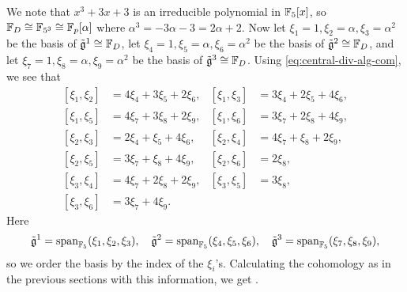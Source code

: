 We note that $x^{3} + 3x + 3$ is an irreducible polynomial in $\mathbb{F}_{5}[x]$, so $\mathbb{F}_{D} \cong \mathbb{F}_{5^{3}} \cong \mathbb{F}_{p}[\alpha]$ where $\alpha^{3} = -3\alpha-3 = 2\alpha + 2$. Now let $\xi_{1} = 1, \xi_{2} = \alpha, \xi_{3} = \alpha^{2}$ be the basis of $\tilde{\mathfrak{g}}^{1} \cong \mathbb{F}_{D}$, let $\xi_{4} = 1, \xi_{5} = \alpha, \xi_{6} = \alpha^{2}$ be the basis of $\tilde{\mathfrak{g}}^{2} \cong \mathbb{F}_{D}$, and let $\xi_{7} = 1, \xi_{8} = \alpha, \xi_{9} = \alpha^{2}$ be the basis of $\tilde{\mathfrak{g}}^{3} \cong \mathbb{F}_{D}$. Using \eqref{eq:central-div-alg-com}, we see that
\begin{equation}\label{eq:central-div-alg-first-com}
  \begin{aligned}
    [\xi_{1},\xi_{2}] &= 4\xi_{4} + 3\xi_{5} + 2\xi_{6}, & [\xi_{1},\xi_{3}] &= 3\xi_{4} + 2\xi_{5} + 4\xi_{6}, \\
    [\xi_{1},\xi_{5}] &= 4\xi_{7} + 3\xi_{8} + 2\xi_{9}, & [\xi_{1},\xi_{6}] &= 3\xi_{7} + 2\xi_{8} + 4\xi_{9}, \\
    [\xi_{2},\xi_{3}] &= 2\xi_{4} + \xi_{5} + 4\xi_{6}, & [\xi_{2},\xi_{4}] &= 4\xi_{7} + \xi_{8} + 2\xi_{9}, \\
    [\xi_{2},\xi_{5}] &= 3\xi_{7} + \xi_{8} + 4\xi_{9}, & [\xi_{2},\xi_{6}] &= 2\xi_{8}, \\
    [\xi_{3},\xi_{4}] &= 4\xi_{7} + 2\xi_{8} + 2\xi_{9}, & [\xi_{3},\xi_{5}] &= 3\xi_{8}, \\
    [\xi_{3},\xi_{6}] &= 3\xi_{7} + 4\xi_{9}.
  \end{aligned}
\end{equation}
Here
\begin{equation*}
  \tilde{\mathfrak{g}}^{1} = \operatorname{span}_{\mathbb{F}_{5}}(\xi_{1},\xi_{2},\xi_{3}), \quad \tilde{\mathfrak{g}}^{2} = \operatorname{span}_{\mathbb{F}_{5}}(\xi_{4},\xi_{5},\xi_{6}), \quad \tilde{\mathfrak{g}}^{3} = \operatorname{span}_{\mathbb{F}_{5}}(\xi_{7},\xi_{8},\xi_{9}),
\end{equation*}
so we order the basis by the index of the $\xi_{i}$'s. Calculating the cohomology as in the previous sections with this information, we get .

